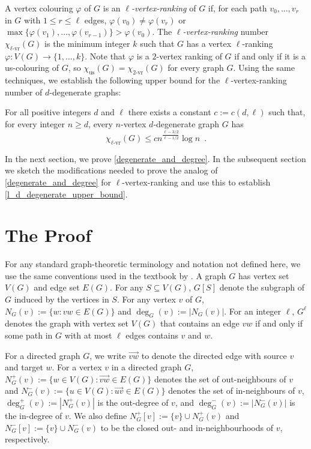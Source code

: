 \documentclass{patmorin}
\newcommand{\defin}[1]{\emph{\color{brightmaroon}#1}}
\newcommand{\rn}[1]{\chi_{\operatorname{#1-vr}}}
\newcommand{\trn}{\chi_{\mathrm{us}}}
\newcommand{\lrn}{\rn{\ell}}
\begin{document}
A vertex colouring $\varphi$ of $G$ is an \defin{$\ell$-vertex-ranking} of $G$ if, for each path $v_0,\ldots,v_r$ in $G$ with $1\le r\le\ell$ edges, $\varphi(v_0)\neq \varphi(v_r)$ or $\max\{\varphi(v_1),\ldots,\varphi(v_{r-1})\}>\varphi(v_0)$.  The \defin{$\ell$-vertex-ranking} number $\lrn(G)$ is the minimum integer $k$ such that $G$ has a vertex $\ell$-ranking $\varphi:V(G)\to\{1,\ldots,k\}$.  Note that $\varphi$ is a $2$-vertex ranking of $G$ if and only if it is a us-colouring of $G$, so $\trn(G)=\rn{2}(G)$ for every graph $G$.  Using the same techniques, we establish the following upper bound for the $\ell$-vertex-ranking number of $d$-degenerate graphs:

\begin{thm}\label{l_d_degenerate_upper_bound}
  For all positive integers $d$ and $\ell$ there exists a constant $c:=c(d,\ell)$ such that, for every integer $n\ge d$, every $n$-vertex $d$-degenerate graph $G$ has
  \[
    \lrn(G)\le c n^{\frac{\ell-3/2}{\ell-1/2}}\log n \enspace .
  \]
\end{thm}

In the next section, we prove \cref{degenerate_and_degree}.  In the subsequent section we sketch the modifications needed to prove the analog of \cref{degenerate_and_degree} for $\ell$-vertex-ranking and use this to establish \cref{l_d_degenerate_upper_bound}.



\section{The Proof}

For any standard graph-theoretic terminology and notation not defined here, we use the same conventions used in the textbook by \citet{diestel:graph}.  A graph $G$ has vertex set $V(G)$ and edge set $E(G)$.  For any $S\subseteq V(G)$, $G[S]$ denote the subgraph of $G$ induced by the vertices in $S$.  For any vertex $v$ of $G$, $N_G(v):=\{w:vw\in E(G)\}$ and $\deg_G(v):=|N_G(v)|$.  For an integer $\ell$, $G^\ell$ denotes the graph with vertex set $V(G)$ that contains an edge $vw$ if and only if some path in $G$ with at most $\ell$ edges contains $v$ and $w$.

For a directed graph $G$, we write $\overrightarrow{vw}$ to denote the directed edge with source $v$ and target $w$.  For a vertex $v$ in a directed graph $G$, $N^+_{G}(v):=\{w\in V(G):\overrightarrow{vw}\in E(G)\}$ denotes the set of out-neighbours of $v$ and $N^-_G(v):=\{u\in V(G):\overrightarrow{uv}\in E(G)\}$ denotes the set of in-neighbours of $v$, $\deg^+_{G}(v):=|N^+_G(v)|$ is the out-degree of $v$, and $\deg^-_{G}(v):=|N^-_G(v)|$ is the in-degree of $v$.  We also define $N^+_{G}[v]:=\{v\}\cup N^+_{G}(v)$ and $N^-_{G}[v]:=\{v\}\cup N^-_{G}(v)$ to be the closed out- and in-neighbourhoods of $v$, respectively.
\end{document}
